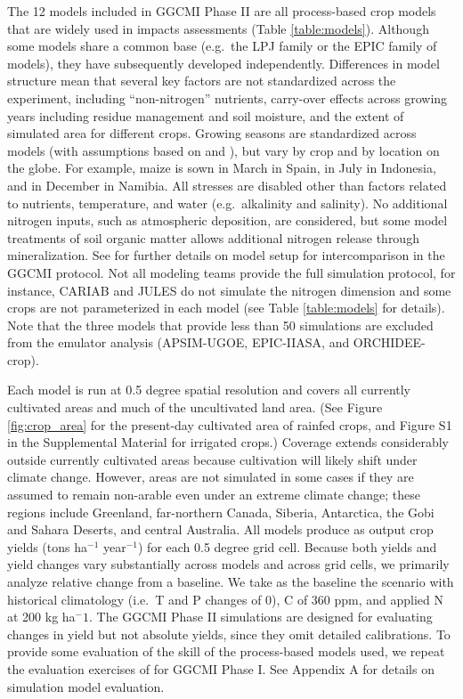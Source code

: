 \documentclass[esd, manuscript]{copernicus} %
\begin{document}
The 12 models included in GGCMI Phase II are all process-based crop models that are widely used in impacts assessments (Table \ref{table:models}). Although some models share a common base (e.g.\ the LPJ family or the EPIC family of models), they have subsequently developed independently. Differences in model structure mean that several key factors are not standardized across the experiment, including ``non-nitrogen'' nutrients, carry-over effects across growing years including residue management and soil moisture, and the extent of simulated area for different crops. Growing seasons are standardized across models (with assumptions based on \citet{Sacks2010} and \citet{Portmann2008, Portmann2010}), but vary by crop and by location on the globe. For example, maize is sown in March in Spain, in July in Indonesia, and in December in Namibia. All stresses are disabled other than factors related to nutrients, temperature, and water (e.g.\ alkalinity and salinity). No additional nitrogen inputs, such as atmospheric deposition, are considered, but some model treatments of soil organic matter allows additional nitrogen release through mineralization. See \citet{Elliott2015} for further details on model setup for intercomparison in the GGCMI protocol. Not all modeling teams provide the full simulation protocol, for instance, CARIAB and JULES do not simulate the nitrogen dimension and some crops are not parameterized in each model (see Table \ref{table:models} for details). Note that the three models that provide less than 50 simulations are excluded from the emulator analysis (APSIM-UGOE, EPIC-IIASA, and ORCHIDEE-crop).

Each model is run at 0.5 degree spatial resolution and covers all currently cultivated areas and much of the uncultivated land area. (See Figure \ref{fig:crop_area} for the present-day cultivated area of rainfed crops, and Figure S1 in the Supplemental Material for irrigated crops.)  Coverage extends considerably outside currently cultivated areas because cultivation will likely shift under climate change.  However, areas are not simulated in some cases if they are assumed to remain non-arable even under an extreme climate change; these regions include Greenland, far-northern Canada, Siberia, Antarctica, the Gobi and Sahara Deserts, and central Australia. All models produce as output crop yields (tons ha$^{-1}$ year$^{-1}$) for each 0.5 degree grid cell. Because both yields and yield changes vary substantially across models and across grid cells, we primarily analyze relative change from a baseline. We take as the baseline the scenario with historical climatology (i.e.\ T and P changes of 0), C of 360 ppm, and applied N at 200 kg ha$^-1$. The GGCMI Phase II simulations are designed for evaluating changes in yield but not absolute yields, since they omit detailed calibrations. To provide some evaluation of the skill of the process-based models used, we repeat the evaluation exercises of \citet{muller_global_2017} for GGCMI Phase I. See Appendix A for details on simulation model evaluation.
\end{document}
